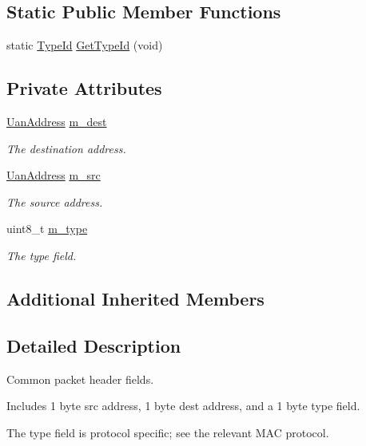 \subsection*{Static Public Member Functions}
\begin{DoxyCompactItemize}
\item 
static \hyperlink{classns3_1_1TypeId}{Type\+Id} \hyperlink{classns3_1_1UanHeaderCommon_a3a5c2ddc51e67a489db563921247c6e2}{Get\+Type\+Id} (void)
\end{DoxyCompactItemize}
\subsection*{Private Attributes}
\begin{DoxyCompactItemize}
\item 
\hyperlink{classns3_1_1UanAddress}{Uan\+Address} \hyperlink{classns3_1_1UanHeaderCommon_a2d1a9633126a057947797399a7e3b90f}{m\+\_\+dest}
\begin{DoxyCompactList}\small\item\em The destination address. \end{DoxyCompactList}\item 
\hyperlink{classns3_1_1UanAddress}{Uan\+Address} \hyperlink{classns3_1_1UanHeaderCommon_acf5021871e306cfa8c7a65df92974b20}{m\+\_\+src}
\begin{DoxyCompactList}\small\item\em The source address. \end{DoxyCompactList}\item 
uint8\+\_\+t \hyperlink{classns3_1_1UanHeaderCommon_a8adf1bd97158c56ac1ee8c51263051fc}{m\+\_\+type}
\begin{DoxyCompactList}\small\item\em The type field. \end{DoxyCompactList}\end{DoxyCompactItemize}
\subsection*{Additional Inherited Members}


\subsection{Detailed Description}
Common packet header fields.

Includes 1 byte src address, 1 byte dest address, and a 1 byte type field.

The type field is protocol specific; see the relevant M\+AC protocol. 

